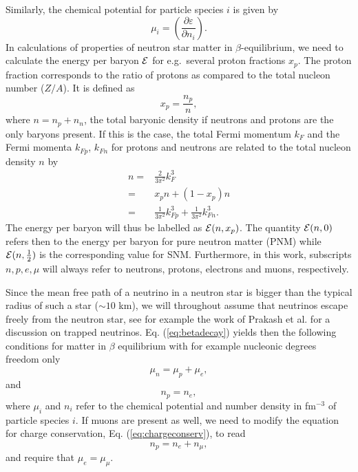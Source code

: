 Similarly, the chemical potential for particle species $i$
is given by
\begin{equation}
     \mu_i = \left(\frac{\partial \varepsilon}{\partial n_i}\right).
     \label{eq:chemicalpotdef}
\end{equation}
In calculations of properties of neutron star matter in $\beta$-equilibrium,
we need to calculate the energy per baryon ${\cal E}$ for e.g.~several 
proton fractions $x_p$. The proton fraction corresponds to
the ratio of protons as
compared to the total nucleon number ($Z/A$). It is 
 defined as
\begin{equation}
    x_p = \frac{n_p}{n},
\end{equation}
where $n=n_p+n_n$, the total baryonic density if neutrons and
protons are the only baryons present. If this is the case,
the total Fermi momentum $k_F$ and the Fermi momenta $k_{Fp}$,
$k_{Fn}$ for protons and neutrons are related to the total nucleon density
$n$ by
\begin{align}
     n = & \frac{2}{3\pi^2} k_F^3 \nonumber \\
       = & x_p n + (1-x_p) n \nonumber \\
       = & \frac{1}{3\pi^2} k_{Fp}^3 + \frac{1}{3\pi^2} k_{Fn}^3.
    \label{eq:densi}
\end{align}
The energy per baryon will thus be
labelled as ${\cal E}(n,x_p)$. The quantity
${\cal E}(n,0)$ refers then to the energy per baryon for pure neutron
matter (PNM) while ${\cal E}(n,\frac{1}{2})$ is the corresponding value for 
SNM. Furthermore, in this work, subscripts $n,p,e,\mu$
will always refer to neutrons, protons, electrons and muons, respectively.


Since the mean free path of a neutrino in a neutron star is bigger
than the typical radius of such a star ($\sim 10$ km), 
we will throughout assume that neutrinos escape freely from the neutron star,
see for example  the work of Prakash et al.
for a discussion
on trapped neutrinos. Eq. (\ref{eq:betadecay}) yields then the following
conditions for matter in $\beta$ equilibrium with for example  nucleonic degrees 
freedom only
\begin{equation}
    \mu_n=\mu_p+\mu_e,
     \label{eq:npebetaequilibrium}
\end{equation}
and 
\begin{equation}
     n_p = n_e,
     \label{eq:chargeconserv}
\end{equation}
where $\mu_i$ and $n_i$ refer to the chemical potential and number density
in fm$^{-3}$ of particle species $i$. 
If muons are present as well,  we need to modify the equation for 
charge conservation, Eq. (\ref{eq:chargeconserv}), to read 
\[
     n_p = n_e+n_{\mu},
\]
and require that $\mu_e = \mu_{\mu}$.

